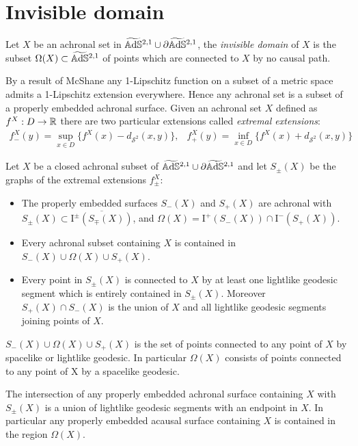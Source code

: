 \section{Invisible domain}
\begin{definition}
    Let $X$ be an achronal set in $\widetilde{\mathbb{A}\mathrm{d}\mathbb{S}}{}^{2,1} \cup \partial\widetilde{\mathbb{A}\mathrm{d}\mathbb{S}}{}^{2,1}$, the \textit{invisible domain} of $X$ is the subset $\Omega(X) \subset \widetilde{\mathbb{A}\mathrm{d}\mathbb{S}}{}^{2,1}$ of points which are connected to $X$ by no causal path.
\end{definition}
By a result of McShane \cite{mcshane1934extension} any 1-Lipschitz function on a subset of a metric space admits a 1-Lipschitz extension everywhere. Hence any achronal set is a subset of a properly embedded achronal surface.
Given an achronal set $X$ defined as $f^X : D \to \mathbb{R}$ there are two particular extensions called \textit{extremal extensions}:
\[
\begin{array}{cc}
    f_-^X(y)= \sup_{x\in D}\{ f^X(x)-d_{\mathcal{S}^2}(x,y) \}, & f_+^X(y)= \inf_{x\in D}\{ f^X(x)+d_{\mathcal{S}^2}(x,y) \}
\end{array}
\]
\begin{lemma}\label{lem:extremal extension}
    Let $X$ be a closed achronal subset of $\widetilde{\mathbb{A}\mathrm{d}\mathbb{S}}{}^{2,1} \cup \partial\widetilde{\mathbb{A}\mathrm{d}\mathbb{S}}{}^{2,1}$ and let $S_\pm (X)$ be the graphs of the extremal extensions $f^X_\pm$:
    \begin{itemize}
        \item The properly embedded surfaces $S_-(X)$ and $S_+(X)$ are achronal with $S_\pm(X) \subset \overline{\text{I}^\pm (S_\mp(X))}$, and $\Omega(X) = \text{I}^+(S_-(X)) \cap \text{I}^-(S_+(X))$.
        \item Every achronal subset containing $X$ is contained in $S_-(X)\cup\Omega(X)\cup S_+(X)$.
        \item Every point in $S_\pm(X)$ is connected to $X$ by at least one lightlike geodesic segment which is entirely contained in $S_\pm(X)$. Moreover $S_+(X) \cap S_-(X)$ is the union of $X$ and all lightlike geodesic segments joining points of $X$.
    \end{itemize}
\end{lemma}

\begin{observation}\label{rem:invisible}
    $S_-(X)\cup\Omega(X)\cup S_+(X)$ is the set of points connected to any point of $X$ by spacelike or lightlike geodesic. In particular $\Omega(X)$ consists of points connected to any point of X by a spacelike geodesic.
\end{observation}
\begin{observation}
    The intersection of any properly embedded achronal surface containing
    $X$ with $S_\pm(X)$ is a union of lightlike geodesic segments with an endpoint in $X$. In particular any properly embedded acausal surface containing $X$ is contained in the region $\Omega(X)$.
\end{observation}

